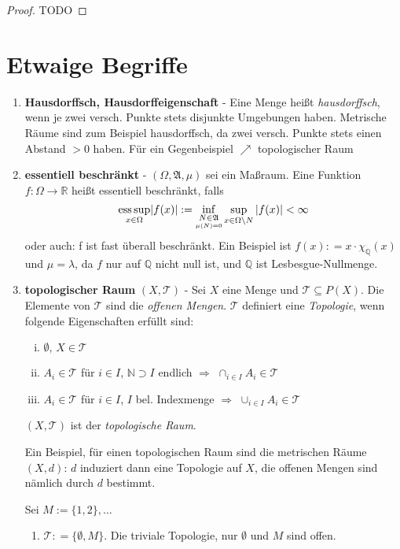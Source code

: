\documentclass[ngerman]{report}
\theoremstyle{plain}%
\theoremstyle{definition}%
\theoremstyle{myStyle}
\newcommand{\R}{\mathbb{R}}
\newcommand{\Q}{\mathbb{Q}}
\newcommand{\N}{\mathbb{N}}
\newcommand{\hA}{\mathfrak{A}}%
\newcommand{\tT}{\mathcal{T}} %
\newcommand{\ess}{\textnormal{ess}}
\newcommand{\df}[1][]{%
	\overset{#1}{\Rightarrow}
}
\begin{document}
	\begin{proof}
		TODO
	\end{proof}

\section*{Etwaige Begriffe}
	\begin{enumerate}
		\item \textbf{Hausdorffsch, Hausdorffeigenschaft} - Eine Menge heißt \textit{hausdorffsch}, wenn je zwei versch. Punkte stets disjunkte Umgebungen haben. Metrische Räume sind zum Beispiel hausdorffsch, da zwei versch. Punkte stets einen Abstand $> 0$ haben. Für ein Gegenbeispiel $\nearrow$ topologischer Raum

		\item \textbf{essentiell beschränkt} - 
					$(\Omega, \hA,\mu)$ sei ein Maßraum. Eine Funktion $f: \Omega \rightarrow \R$ heißt essentiell beschränkt, falls 
					$$\underset{x\in\Omega}{\ess \sup} |f(x)| := {\inf_{\underset{\mu(N)=0}{N \in \hA}} }  
					\sup_{x\in \Omega\backslash N} |f(x)| < \infty$$
					oder auch: f ist fast überall beschränkt. 
					Ein Beispiel ist $f(x) : = x\cdot \chi_\Q(x)$ und $\mu = \lambda$, da $f$ nur auf $\Q$ nicht null ist, und $\Q$ ist Lesbesgue-Nullmenge. 

		\item \textbf{topologischer Raum} $(X,\tT)$ - Sei $X$ eine Menge und $\tT\subseteq P(X)$. Die Elemente von $\tT$ sind die \textit{offenen Mengen}. $\tT$ definiert eine \textit{Topologie}, wenn folgende Eigenschaften erfüllt sind:
	\begin{enumerate}[(i)]
	\item $\emptyset,\,X\in \tT$

\item $A_i\in\tT$ für $i\in I$, $\N \supset I$ endlich $\df$ $\cap_{i\in I} A_i\in\tT$

\item $A_i\in\tT$ für $i\in I$, $I$ bel. Indexmenge $\df$ $\cup_{i\in I}A_i \in \tT$
\end{enumerate}
	$(X,\tT)$ ist der \textit{topologische Raum}.\par
Ein Beispiel, für einen topologischen Raum sind die metrischen Räume $(X,d)$: $d$ induziert dann eine Topologie auf $X$, die offenen Mengen sind nämlich durch $d$ bestimmt.\par
Sei $M:=\{1,2\},\dots$
\begin{enumerate}[]
\item $\tT: = \{\emptyset,M\}$. Die triviale Topologie, nur $\emptyset$ und $M$ sind offen.


\end{enumerate}
\end{enumerate}
\end{document}
